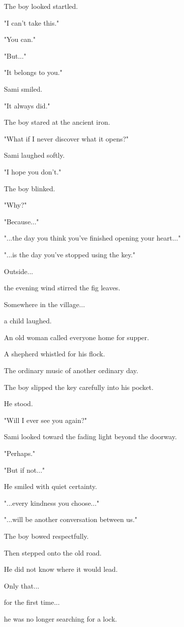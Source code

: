 \documentclass[12pt,openany]{book}
\begin{document}
The boy looked startled.

"I can't take this."

"You can."

"But..."

"It belongs to you."

Sami smiled.

"It always did."

The boy stared at the ancient iron.

"What if I never discover what it opens?"

Sami laughed softly.

"I hope you don't."

The boy blinked.

"Why?"

"Because..."

"...the day you think you've finished opening your heart..."

"...is the day you've stopped using the key."

Outside...

the evening wind stirred the fig leaves.

Somewhere in the village...

a child laughed.

An old woman called everyone home for supper.

A shepherd whistled for his flock.

The ordinary music of another ordinary day.

The boy slipped the key carefully into his pocket.

He stood.

"Will I ever see you again?"

Sami looked toward the fading light beyond the doorway.

"Perhaps."

"But if not..."

He smiled with quiet certainty.

"...every kindness you choose..."

"...will be another conversation between us."

The boy bowed respectfully.

Then stepped onto the old road.

He did not know where it would lead.

Only that...

for the first time...

he was no longer searching for a lock.
\end{document}
